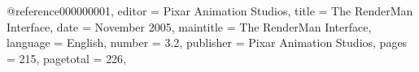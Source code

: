 @reference{000000001,
	editor = {Pixar Animation Studios},
	title = {The RenderMan Interface},
	date = {November 2005},
	maintitle = {The RenderMan Interface},
	language = {English},
	number = {3.2},
	publisher = {Pixar Animation Studios},
	pages = {215},
	pagetotal = {226},
}
